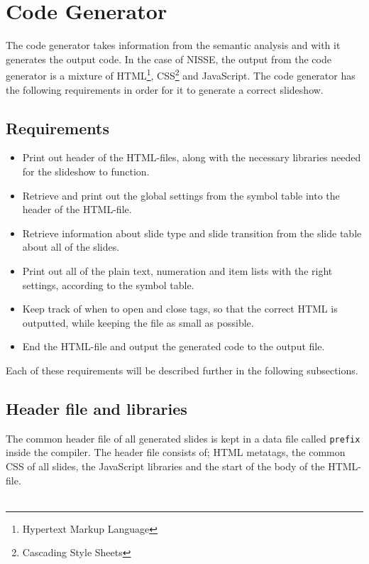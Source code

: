 \chapter{Code Generator}

The code generator takes information from the semantic analysis and with it generates the output code. In the case of NISSE, the output from the code generator is a mixture of HTML\footnote{Hypertext Markup Language}, CSS\footnote{Cascading Style Sheets} and JavaScript. The code generator has the following requirements in order for it to generate a correct slideshow.

\section{Requirements}
\begin{itemize}
  \item Print out header of the HTML-files, along with the necessary libraries needed for the slideshow to function.
  \item Retrieve and print out the global settings from the symbol table into the header of the HTML-file.
  \item Retrieve information about slide type and slide transition from the slide table about all of the slides.
  \item Print out all of the plain text, numeration and item lists with the right settings, according to the symbol table.
  \item Keep track of when to open and close tags, so that the correct HTML is outputted, while keeping the file as small as possible.
  \item End the HTML-file and output the generated code to the output file.
\end{itemize}
Each of these requirements will be described further in the following subsections.

\section{Header file and libraries}
The common header file of all generated slides is kept in a data file called \texttt{prefix} inside the compiler. The header file consists of; HTML metatags, the common CSS of all slides, the JavaScript libraries and the start of the body of the HTML-file. \\

 \\

